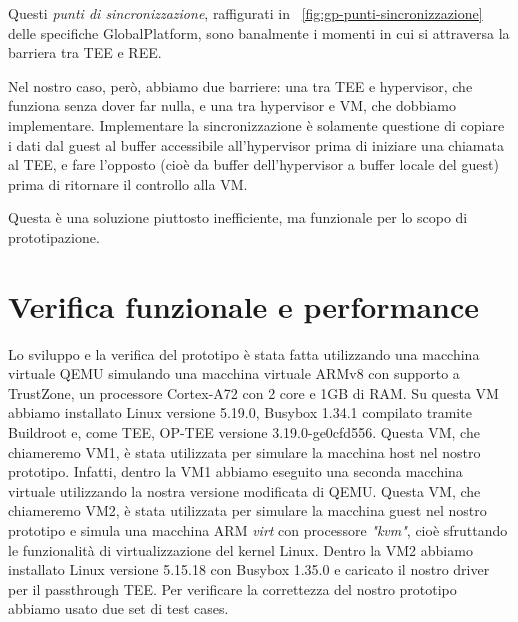 \documentclass[12pt,italian]{report}
\begin{document}
Questi \textit{punti di sincronizzazione}, raffigurati in
\figurename~\ref{fig:gp-punti-sincronizzazione} delle specifiche GlobalPlatform,
sono banalmente i momenti in cui si attraversa la barriera tra TEE e REE.

Nel nostro caso, però, abbiamo due barriere: una tra TEE e hypervisor,
che funziona
senza dover far nulla, e una tra hypervisor e VM, che dobbiamo implementare.
Implementare la sincronizzazione è solamente questione di copiare i dati dal
guest al buffer accessibile all'hypervisor prima di iniziare una chiamata
al TEE, e fare l'opposto (cioè da buffer dell'hypervisor a buffer locale
del guest) prima di ritornare il controllo alla VM.

Questa è una soluzione piuttosto inefficiente, ma funzionale per lo scopo di
prototipazione.

\section{Verifica funzionale e performance}
\label{sec:verifica-funzionale-e-performance}
Lo sviluppo e la verifica del prototipo è stata fatta utilizzando una macchina
virtuale QEMU simulando una macchina virtuale ARMv8 con supporto a TrustZone,
un processore Cortex-A72 con 2 core e 1GB di RAM.
Su questa VM abbiamo installato Linux versione 5.19.0,
Busybox 1.34.1 compilato tramite Buildroot e, come TEE, OP-TEE versione
3.19.0-ge0cfd556.
Questa VM, che chiameremo VM1, è stata utilizzata per simulare la macchina
host nel nostro prototipo. Infatti, dentro la VM1 abbiamo eseguito una
seconda macchina virtuale utilizzando la nostra versione modificata di QEMU.
Questa VM, che chiameremo VM2, è stata utilizzata per simulare la macchina
guest nel nostro prototipo e simula una macchina ARM \textit{virt} con
processore \textit{"kvm"}, cioè sfruttando le funzionalità di virtualizzazione
del kernel Linux.
Dentro la VM2 abbiamo installato Linux versione 5.15.18 con Busybox 1.35.0
e caricato il nostro driver per il passthrough TEE.
Per verificare la correttezza del nostro prototipo abbiamo usato due set di
test cases.
\end{document}
